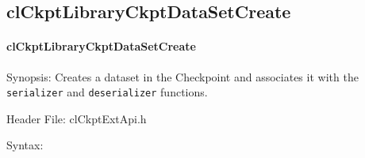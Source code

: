 \begin{flushleft}
\subsection{clCkptLibraryCkptDataSetCreate}
\hypertarget{pageckpt205}{}\paragraph{cl\-Ckpt\-Library\-Ckpt\-Data\-Set\-Create}\label{pageckpt205}
\begin{Desc}
\item[Synopsis:]Creates a dataset in the Checkpoint and associates it with the {\tt{serializer}} and {\tt{deserializer}} functions.\end{Desc}
\begin{Desc}
\item[Header File:]clCkptExtApi.h\end{Desc}
\begin{Desc}
\item[Syntax:]


\end{Desc}
\end{flushleft}
